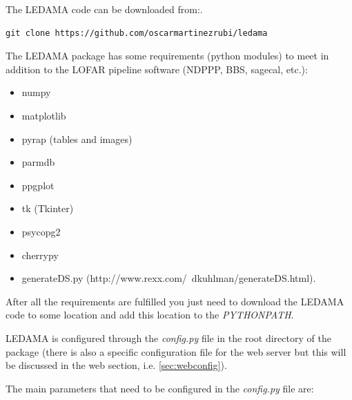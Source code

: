 \documentclass[a4paper,11pt]{article}
\begin{document}
The LEDAMA code can be downloaded from:.

\begin{verbatim}
git clone https://github.com/oscarmartinezrubi/ledama
\end{verbatim}

The LEDAMA package has some requirements (python modules) to meet in addition to the LOFAR pipeline software (NDPPP, BBS, sagecal, etc.):

\begin{itemize}
	\item numpy
	\item matplotlib
	\item pyrap (tables and images)
	\item parmdb
	\item ppgplot
	\item tk (Tkinter)
	\item psycopg2
	\item cherrypy
	\item generateDS.py (http://www.rexx.com/~dkuhlman/generateDS.html).	
\end{itemize}

After all the requirements are fulfilled you just need to download the LEDAMA code to some location and add this location to the \textit{PYTHONPATH}.

LEDAMA is configured through the \textit{config.py} file in the root directory of the package (there is also a specific configuration file for the web server but this will be discussed in the web section, i.e. \ref{sec:webconfig}).

The main parameters that need to be configured in the \textit{config.py} file are:
\end{document}
